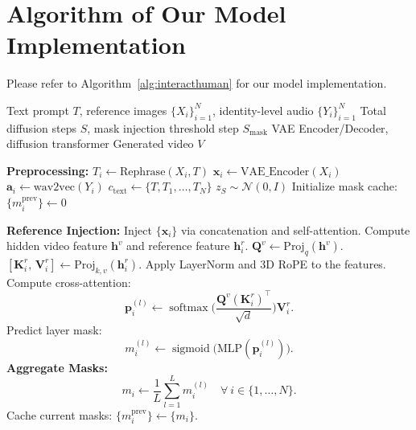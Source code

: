 \documentclass{article} %
\begin{document}
\section{Algorithm of Our Model Implementation}
Please refer to Algorithm~\ref{alg:interacthuman} for our model implementation.
\begin{algorithm}[ht]
\caption{InterActHuman: Audio-Driven Multi-Concept Video Generation Inference}
\label{alg:interacthuman}
\begin{algorithmic}[1]
    \Require 
        \Statex Text prompt $T$, reference images $\{X_i\}_{i=1}^N$, identity-level audio $\{Y_i\}_{i=1}^N$
        \Statex Total diffusion steps $S$, mask injection threshold step $S_{\text{mask}}$
        \Statex VAE Encoder/Decoder, diffusion transformer
    \Ensure Generated video $V$
    
    \State \textbf{Preprocessing:}
        \State $T_i \gets \text{Rephrase}(X_i, T)$ 
        \State $\mathbf{x}_i \gets \text{VAE\_Encoder}(X_i)$ 
        \State $\mathbf{a}_i \gets \text{wav2vec}(Y_i)$ 
    \EndFor
    \State $c_{\text{text}} \gets \{T, T_1, \ldots, T_N\}$ 
    \State $z_S \sim \mathcal{N}(0, I)$ 
    \State Initialize mask cache: $\{m_i^\text{prev}\} \gets 0$
    
                \State \textbf{Reference Injection:} Inject $\{\mathbf{x}_i\}$ via concatenation and self-attention.
                \State Compute hidden video feature $\mathbf{h}^{v}$ and reference feature $\mathbf{h}^{r}_i$.
                \State $\mathbf{Q}^{v} \gets \text{Proj}_q(\mathbf{h}^{v})$. \quad  $[\mathbf{K}^{r}_i,\, \mathbf{V}^{r}_i] \gets \text{Proj}_{k,v}(\mathbf{h}^{r}_i)$.
                \State Apply LayerNorm and 3D RoPE to the features.
                \State Compute cross-attention:
                \[
                \mathbf{p}^{(l)}_i \gets \operatorname{softmax}\Big(\frac{\mathbf{Q}^{v} (\mathbf{K}^{r}_i)^{\top}}{\sqrt{d}}\Big)\mathbf{V}^{r}_i.
                \]
                \State Predict layer mask: 
                \[
                m^{(l)}_i \gets \operatorname{sigmoid}\Big(\text{MLP}(\mathbf{p}^{(l)}_i)\Big).
                \]
            \EndFor
        \EndFor
        \State \textbf{Aggregate Masks:} 
        \[
        m_i \gets \frac{1}{L}\sum_{l=1}^{L} m^{(l)}_i \quad \forall~ i \in \{1,\ldots,N\}.
        \]
        \State Cache current masks: $\{m_i^\text{prev}\} \gets \{m_i\}$.
        

\end{algorithmic}
\end{algorithm}
\end{document}
